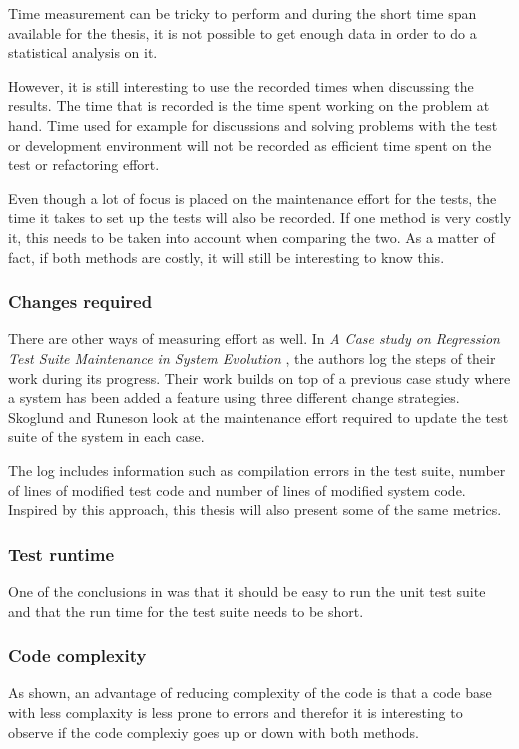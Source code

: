 \documentclass{article}
\begin{document}
			Time measurement can be tricky to perform and during the short time span available for the thesis, it is not possible to get enough data in order to do a statistical analysis on it. 

			However, it is still interesting to use the recorded times when discussing the results. The time that is recorded is the time spent working on the problem at hand. Time used for example for discussions and solving problems with the test or development environment will not be recorded as efficient time spent on the test or refactoring effort.
			
			Even though a lot of focus is placed on the maintenance effort for the tests, the time it takes to set up the tests will also be recorded. If one method is very costly it, this needs to be taken into account when comparing the two. As a matter of fact, if both methods are costly, it will still be interesting to know this.

			\subsubsection{Changes required}
			There are other ways of measuring effort as well. In {\em A Case study on Regression Test Suite Maintenance in System Evolution} \cite{regression}, the authors log the steps of their work during its progress. 
			Their work builds on top of a previous case study where a system has been added a feature using three different change strategies. Skoglund and Runeson look at the maintenance effort required to update the test suite of the system in each case. 

			The log includes information such as compilation errors in the test
			suite, number of lines of modified test code and number of lines of modified system code. Inspired by this approach, this thesis will also present some of the same metrics.

			\subsubsection{Test runtime}
			One of the conclusions in \cite{unit} was that it should be easy to run the unit test suite and that the run time for the test suite needs to be short. 

			\subsubsection{Code complexity}
			As shown, an advantage of reducing complexity of the code is that a code base with less complaxity is less prone to errors and therefor it is interesting to observe if the code complexiy goes up or down with both methods.   
\end{document}
